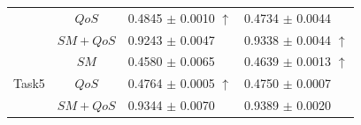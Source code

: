 \begin{table}[]
\begin{tabular}{c|c|l|l}
                        &$QoS$     &0.4845 $\pm$ 0.0010 $\uparrow$    &0.4734 $\pm$ 0.0044            \\ \cline{2-4}
                        &$SM+QoS$  &0.9243 $\pm$ 0.0047               &0.9338 $\pm$ 0.0044 $\uparrow$           \\ \hline
\multirow{3}{*}{Task5}  &$SM$      &0.4580 $\pm$ 0.0065               &0.4639 $\pm$ 0.0013 $\uparrow$ \\ \cline{2-4} 
                        &$QoS$     &0.4764 $\pm$ 0.0005 $\uparrow$    &0.4750 $\pm$ 0.0007            \\ \cline{2-4}
                        &$SM+QoS$  &0.9344 $\pm$ 0.0070               &0.9389 $\pm$ 0.0020           \\ \hline
\end{tabular}
\end{table}
